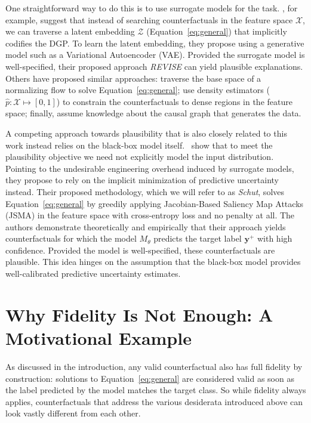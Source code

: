 \documentclass[letterpaper]{article} %
\begin{document}
One straightforward way to do this is to use surrogate models for the task. \citet{joshi2019realistic}, for example, suggest that instead of searching counterfactuals in the feature space $\mathcal{X}$, we can traverse a latent embedding $\mathcal{Z}$ (Equation~\ref{eq:general}) that implicitly codifies the DGP. To learn the latent embedding, they propose using a generative model such as a Variational Autoencoder (VAE). Provided the surrogate model is well-specified, their proposed approach \textit{REVISE} can yield plausible explanations. Others have proposed similar approaches: \citet{dombrowski2021diffeomorphic} traverse the base space of a normalizing flow to solve Equation~\ref{eq:general}; \citet{poyiadzi2020face} use density estimators ($\hat{p}: \mathcal{X} \mapsto [0,1]$) to constrain the counterfactuals to dense regions in the feature space; finally, \citet{karimi2021algorithmic} assume knowledge about the causal graph that generates the data.

A competing approach towards plausibility that is also closely related to this work instead relies on the black-box model itself.~\citet{schut2021generating} show that to meet the plausibility objective we need not explicitly model the input distribution. Pointing to the undesirable engineering overhead induced by surrogate models, they propose to rely on the implicit minimization of predictive uncertainty instead. Their proposed methodology, which we will refer to as \textit{Schut}, solves Equation~\ref{eq:general} by greedily applying Jacobian-Based Saliency Map Attacks (JSMA) in the feature space with cross-entropy loss and no penalty at all. The authors demonstrate theoretically and empirically that their approach yields counterfactuals for which the model $M_{\theta}$ predicts the target label $\mathbf{y}^+$ with high confidence. Provided the model is well-specified, these counterfactuals are plausible. This idea hinges on the assumption that the black-box model provides well-calibrated predictive uncertainty estimates.

\section{Why Fidelity Is Not Enough: A Motivational Example}\label{fidelity}

As discussed in the introduction, any valid counterfactual also has full fidelity by construction: solutions to Equation~\ref{eq:general} are considered valid as soon as the label predicted by the model matches the target class. So while fidelity always applies, counterfactuals that address the various desiderata introduced above can look vastly different from each other. 
\end{document}
